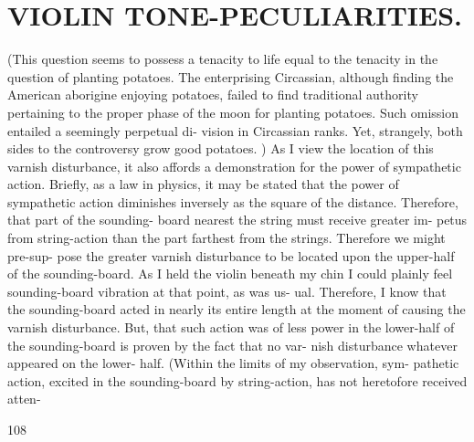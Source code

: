 \documentclass{article}
\begin{document}
\section*{VIOLIN TONE-PECULIARITIES.}
(This question seems to possess a tenacity to life equal to the tenacity in the question of planting potatoes. The enterprising Circassian, although finding the American aborigine enjoying potatoes, failed to find traditional authority pertaining to the proper phase of the moon for planting potatoes. Such omission entailed a seemingly perpetual di- vision in Circassian ranks. Yet, strangely, both sides to the controversy grow good potatoes. ) As I view the location of this varnish disturbance, it also affords a demonstration for the power of sympathetic action. Briefly, as a law in physics, it may be stated that the power of sympathetic action diminishes inversely as the square of the distance. Therefore, that part of the sounding- board nearest the string must receive greater im- petus from string-action than the part farthest from the strings. Therefore we might pre-sup- pose the greater varnish disturbance to be located upon the upper-half of the sounding-board. As I held the violin beneath my chin I could plainly feel sounding-board vibration at that point, as was us- ual. Therefore, I know that the sounding-board acted in nearly its entire length at the moment of causing the varnish disturbance. But, that such action was of less power in the lower-half of the sounding-board is proven by the fact that no var- nish disturbance whatever appeared on the lower- half. (Within the limits of my observation, sym- pathetic action, excited in the sounding-board by string-action, has not heretofore received atten-

108
\end{document}

